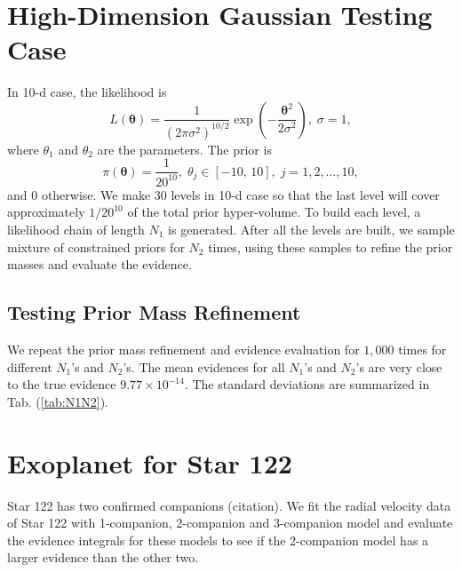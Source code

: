 \documentclass[letterpaper, preprint]{aastex}
\begin{document}
\section{High-Dimension Gaussian Testing Case}

In 10-d case, the likelihood is
\begin{equation}
L(\boldsymbol{\theta})=\frac{1}{(2\pi\sigma^2)^{10/2}}\exp{\left(-\frac{\boldsymbol{\theta}^2}{2\sigma^2}\right)},\;\sigma = 1,
\label{eq:likelihood10}
\end{equation}
where $\theta_1$ and $\theta_2$ are the parameters. The prior is
\begin{equation}
\pi(\boldsymbol{\theta}) = \frac{1}{20^{10}},\;\theta_j\in[-10,\,10],\;j=1,2,\ldots,10,
\label{eq:prior10}
\end{equation}
and 0 otherwise. We make 30 levels in 10-d case so that the last level will cover approximately $1/20^{10}$ of the total prior hyper-volume. To build each level, a likelihood chain of length $N_1$ is generated. After all the levels are built, we sample mixture of constrained priors for $N_2$ times, using these samples to refine the prior masses and evaluate the evidence.

\subsection{Testing Prior Mass Refinement}
We repeat the prior mass refinement and evidence evaluation for $1,000$ times for different $N_1$'s and $N_2$'s. The mean evidences for all $N_1$'s and $N_2$'s are very close to the true evidence  $9.77\times10^{-14}$. The standard deviations are summarized in Tab. (\ref{tab:N1N2}).

\section{Exoplanet for Star 122}
Star 122 has two confirmed companions (citation). We fit the radial velocity data of Star 122 with 1-companion, 2-companion and 3-companion model and evaluate the evidence integrals for these models to see if the 2-companion model has a larger evidence than the other two.
\end{document}
